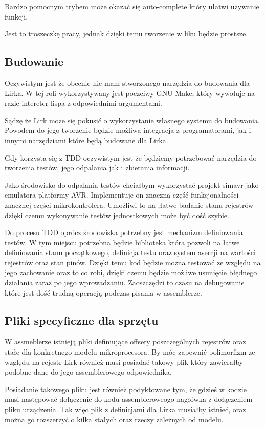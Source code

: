 \documentclass[11pt]{article}
\begin{document}
Bardzo pomocnym trybem może okazać się auto-complete który ułatwi używanie funkcji.

Jest to troszeczkę pracy, jednak dzięki temu tworzenie w liku będzie prostsze.
\subsection{Budowanie}
Oczywistym jest że obecnie nie mam stworzonego narzędzia do budowania dla Lirka. W tej roli wykorzystywany jest poczciwy GNU Make, który wywołuje na razie intereter lispa z odpowiednimi argumentami.

Sądzę że Lirk może się pokusić o wykorzystanie własnego systemu do budowania. Powodem do jego tworzenie będzie możliwa integracja z programatorami, jak i innymi narzędziami które będą budowane dla Lirka. 

Gdy korzysta się z TDD oczywistym jest że będziemy potrzebować narzędzia do tworzenia testów, jego odpalania jak i zbierania informacji.

Jako środowisko do odpalania testów chciałbym wykorzystać projekt simavr jako emulatora platformy AVR. 
Implementuje on znaczną część funkcjonalności znacznej części mikrokontrolera. Umożliwi to na ,łatwe badanie stanu rejestrów dzięki czemu wykonywanie testów jednostkowych może być dość szybie.

Do procesu TDD oprócz środowiska potrzebny jest mechanizm definiowania testów. W tym miejscu potrzebna będzie biblioteka która pozwoli na łatwe definiowania stanu początkowego,
definicja testu oraz system asercji na wartości rejestrów oraz stan pinów. Dzięki temu kod będzie można testować ze względu na jego zachowanie oraz to co robi, dzięki czemu będzie możliwe usunięcie błędnego działania zaraz po jego wprowadzaniu. Zaoszczędzi to czasu na debugowanie które jest dość trudną operacją podczas pisania w assemblerze.

\subsection{Pliki specyficzne dla sprzętu}
 W assmeblerze istnieją pliki definiujące offsety poszczególnych rejestrów oraz stałe dla konkretnego modelu mikroprocesora. By móc zapewnić polimorfizm ze względu na rejestr Lirk również musi posiadać takowy plik który zawierałby podobne dane do jego assemblerowego odpowiednika.
 
Posiadanie takowego pliku jest również podyktowane tym, że gdzieś w kodzie musi następować dołączenie do kodu assembleroweogo nagłówka z dołączeniem pliku urządzenia. Tak więc plik z definicjami dla Lirka musiałby istnieć, oraz można go rozszerzyć o kilka stałych oraz rzeczy zależnych od modelu.
\end{document}
